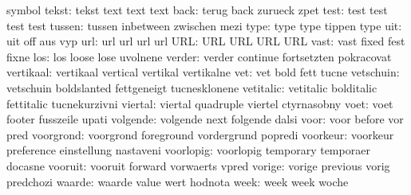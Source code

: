                       symbol
              tekst:  tekst                text                text
                      text
               back:  terug                back                zurueck
                      zpet
               test:  test                 test                test
                      test
             tussen:  tussen               inbetween           zwischen
                      mezi
               type:  type                 type                tippen
                      type
                uit:  uit                  off                 aus
                      vyp %
                url:  url                  url                 url
                      url
                URL:  URL                  URL                 URL
                      URL
               vast:  vast                 fixed               fest
                      fixne
                los:  los                  loose               lose
                      uvolnene
             verder:  verder               continue            fortsetzten
                      pokracovat
          vertikaal:  vertikaal            vertical            vertikal
                      vertikalne
                vet:  vet                  bold                fett
                      tucne
          vetschuin:  vetschuin            boldslanted         fettgeneigt
                      tucnesklonene
          vetitalic:  vetitalic            bolditalic          fettitalic
                      tucnekurzivni
            viertal:  viertal              quadruple           viertel
                      ctyrnasobny
               voet:  voet                 footer              fusszeile
                      upati
           volgende:  volgende             next                folgende
                      dalsi
               voor:  voor                 before              vor
                      pred
          voorgrond:  voorgrond            foreground          vordergrund
                      popredi
           voorkeur:  voorkeur             preference          einstellung
                      nastaveni
          voorlopig:  voorlopig            temporary           temporaer
                      docasne
            vooruit:  vooruit              forward             vorwaerts
                      vpred
             vorige:  vorige               previous            vorig
                      predchozi
             waarde:  waarde               value               wert
                      hodnota
               week:  week                 week                woche
